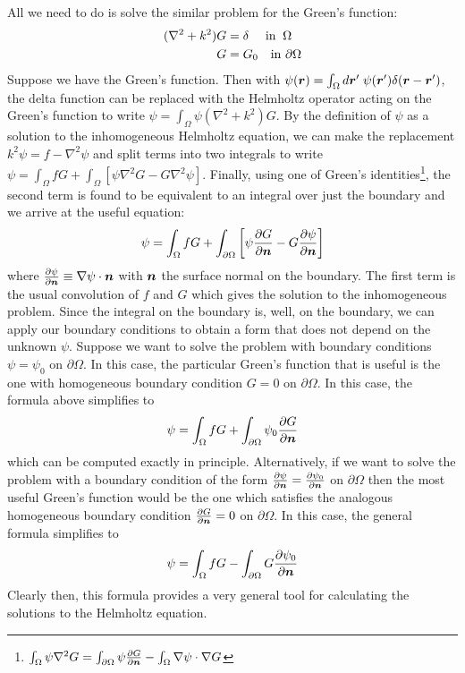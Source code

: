 \documentclass[twocolumn]{gwclass}
\begin{document}
	All we need to do is solve the similar problem for the Green's function:
		\begin{align*}
		(\nabla^2 + k^2)G &= \delta \quad\text{\normalfont{ in }}\:\Omega\\
		G &= G_0 \quad\text{\normalfont{in }} \partial\Omega 
	\end{align*}
	Suppose we have the Green's function. Then with $\psi(\boldsymbol{r}) = \int_\Omega d\boldsymbol{r}'\;\psi(\boldsymbol{r}')\delta(\boldsymbol{r}-\boldsymbol{r}')$, the delta function can be replaced with the Helmholtz operator acting on the Green's function to write $ \psi = \int_\Omega \psi (\nabla^2  + k^2) G$.	By the definition of $\psi$ as a solution to the inhomogeneous Helmholtz equation, we can make the replacement $k^2\psi=f - \nabla^2\psi$ and split terms into two integrals to write $ \psi =  \int_\Omega f G + \int_\Omega [\psi\nabla^2 G - G\nabla^2\psi] $.
	Finally, using one of Green's identities\footnote{$\int_\Omega \psi\nabla^2 G = \int_{\partial\Omega}\psi\frac{\partial G}{\partial \boldsymbol{n}} - \int_\Omega \nabla\psi\cdot\nabla G$}, the second term is found to be equivalent to an integral over just the boundary and we arrive at the useful equation:
	$$ \psi = \int_\Omega fG + \int_{\partial\Omega}\left[\psi\frac{\partial G}{\partial \boldsymbol{n}} - G\frac{\partial \psi}{\partial\boldsymbol{n}}\right] $$
	where $\frac{\partial\psi}{\partial\boldsymbol{n}}\equiv \nabla\psi\cdot\boldsymbol{n}$ with $\boldsymbol{n}$ the surface normal on the boundary. The first term is the usual convolution of $f$ and $G$ which gives the solution to the inhomogeneous problem. Since the integral on the boundary is, well, on the boundary, we can apply our boundary conditions to obtain a form that does not depend on the unknown $\psi$. Suppose we want to solve the problem with boundary conditions $\psi=\psi_0$ on $\partial\Omega$. In this case, the particular Green's function that is useful is the one with homogeneous boundary condition $G=0$ on $\partial\Omega$. In this case, the formula above simplifies to
	$$ \psi = \int_\Omega f G + \int_{\partial\Omega} \psi_0 \frac{\partial G}{\partial\boldsymbol{n}} $$
	which can be computed exactly in principle. Alternatively, if we want to solve the problem with a boundary condition of the form $\frac{\partial\psi}{\partial\boldsymbol{n}} = \frac{\partial\psi_0}{\partial\boldsymbol{n}}$ on $\partial\Omega$ then the most useful Green's function would be the one which satisfies the analogous homogeneous boundary condition $\frac{\partial G}{\partial\boldsymbol{n}} = 0$ on $\partial\Omega$. In this case, the general formula simplifies to
	$$ \psi = \int_\Omega fG - \int_{\partial\Omega} G\frac{\partial\psi_0}{\partial\boldsymbol{n}} $$
	Clearly then, this formula provides a very general tool for calculating the solutions to the Helmholtz equation.
	
\end{document}
